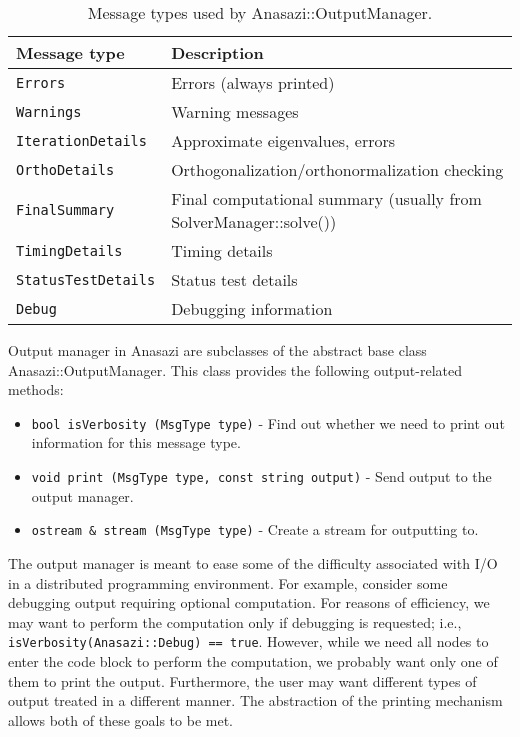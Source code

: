 \begin{table}
\begin{center}
  \begin{tabular}{| p{4cm} p{8cm} |}
\hline
Message type & Description \\
\hline
{\tt Errors           } & Errors (always printed)  \\
{\tt Warnings         } & Warning messages   \\
{\tt IterationDetails } & Approximate eigenvalues, errors   \\
{\tt OrthoDetails     } & Orthogonalization/orthonormalization checking \\
{\tt FinalSummary     } & Final computational summary (usually from SolverManager::solve())  \\
{\tt TimingDetails    } & Timing details  \\
{\tt StatusTestDetails} & Status test details   \\
{\tt Debug            } & Debugging information \\
\hline
\end{tabular}
\caption{Message types used by Anasazi::OutputManager.}
\label{tab:anasazi:om}
\end{center}
\end{table}

Output manager in Anasazi are subclasses of the abstract base class
Anasazi::Output\-Manager. This class provides the following output-related methods:
\begin{itemize}
  \item {\tt bool isVerbosity (MsgType type)} - 
  Find out whether we need to print out information for this message type.
\item {\tt void  print (MsgType type, const string output)} - 
  Send output to the output manager.
\item {\tt ostream \& stream (MsgType type)} - 
  Create a stream for outputting to.
\end{itemize}

The output manager is meant to ease some of the difficulty associated with I/O in a
distributed programming environment. For example, consider some debugging output requiring
optional computation. For reasons of efficiency, we may want to perform the computation
only if debugging is requested; i.e., \verb!isVerbosity(Anasazi::Debug) == true!. However,
while we need all nodes to enter the code block to perform the computation, we probably
want only one of them to print the output. Furthermore, the user may want different types
of output treated in a different manner. The abstraction of the printing
mechanism allows both of these goals to be met.

